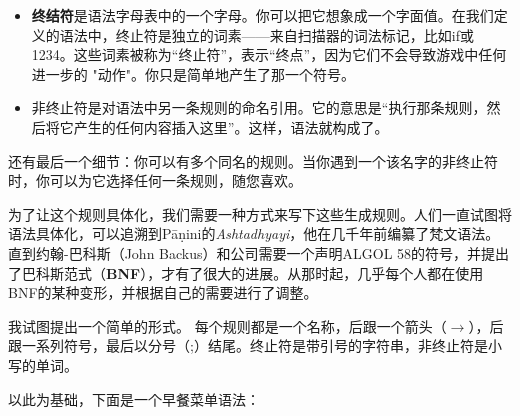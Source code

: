 \documentclass[cn,11pt,chinese]{elegantbook}
\begin{document}
\begin{itemize}
  \item \textbf{终结符}是语法字母表中的一个字母。你可以把它想象成一个字面值。在我们定义的语法中，终止符是独立的词素——来自扫描器的词法标记，比如if或1234。这些词素被称为“终止符”，表示“终点”，因为它们不会导致游戏中任何进一步的 "动作"。你只是简单地产生了那一个符号。
  \item 非终止符是对语法中另一条规则的命名引用。它的意思是“执行那条规则，然后将它产生的任何内容插入这里”。这样，语法就构成了。
\end{itemize}

还有最后一个细节：你可以有多个同名的规则。当你遇到一个该名字的非终止符时，你可以为它选择任何一条规则，随您喜欢。

为了让这个规则具体化，我们需要一种方式来写下这些生成规则。人们一直试图将语法具体化，可以追溯到Pāṇini的\textit{Ashtadhyayi}，他在几千年前编纂了梵文语法。直到约翰-巴科斯（John Backus）和公司需要一个声明ALGOL 58的符号，并提出了巴科斯范式（\textbf{BNF}），才有了很大的进展。从那时起，几乎每个人都在使用BNF的某种变形，并根据自己的需要进行了调整。

我试图提出一个简单的形式。 每个规则都是一个名称，后跟一个箭头（$\rightarrow$），后跟一系列符号，最后以分号（;）结尾。终止符是带引号的字符串，非终止符是小写的单词。

以此为基础，下面是一个早餐菜单语法：
\end{document}
